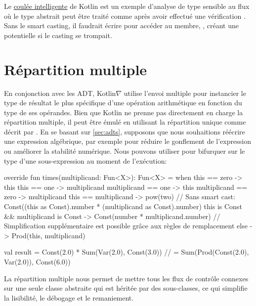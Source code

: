 %
Le \href{https://kotlinlang.org/docs/reference/typecasts.html#smart-casts}{coulée intelligente} de Kotlin est un exemple d'analyse de type sensible au flux~\citep{pearce2011implementing} où le type abstrait  peut être traité comme  après avoir effectué une vérification . Sans le smart casting, il faudrait écrire  pour accéder au membre, , créant une  potentielle si le casting se trompait.

\section{Répartition multiple}\label{sec:multiple-dispatch}

En conjonction avec les ADT, Kotlin$\nabla$ utilise l'envoi multiple pour instancier le type de résultat le plus spécifique d'une opération arithmétique en fonction du type de ses opérandes. Bien que Kotlin ne prenne pas directement en charge la répartition multiple, il peut être émulé en utilisant la répartition unique comme décrit par \citet{leavens1998multiple}. En se basant sur \autoref{sec:adts}, supposons que nous souhaitions réécrire une expression algébrique, par exemple pour réduire le gonflement de l'expression ou améliorer la stabilité numérique. Nous pouvons utiliser  pour bifurquer sur le type d'une sous-expression au moment de l'exécution:

\begin{kotlinlisting}
override fun times(multiplicand: Fun<X>): Fun<X> =
    when {
        this == zero -> this
        this == one -> multiplicand
        multiplicand == one -> this
        multiplicand == zero -> multiplicand
        this == multiplicand -> pow(two)
        // Sans smart cast: Const((this as Const).number * (multiplicand as Const).number)
        this is Const && multiplicand is Const -> Const(number * multiplicand.number)
        // Simplification supplémentaire est possible grâce aux règles de remplacement
        else -> Prod(this, multiplicand)
    }

val result = Const(2.0) * Sum(Var(2.0), Const(3.0))
//         = Sum(Prod(Const(2.0), Var(2.0)), Const(6.0))
\end{kotlinlisting}
%
La répartition multiple nous permet de mettre tous les flux de contrôle connexes sur une seule classe abstraite qui est héritée par des sous-classes, ce qui simplifie la lisibilité, le débogage et le remaniement.

